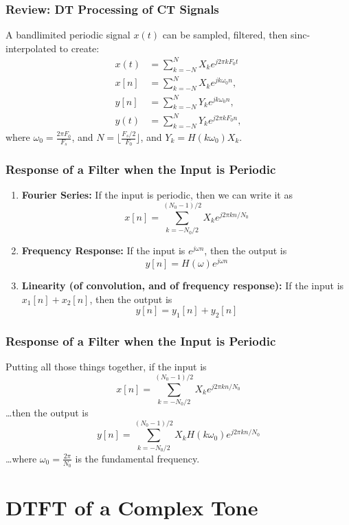 \documentclass{beamer}
\begin{document}
\begin{frame}
  \frametitle{Review: DT Processing of CT Signals}

  A bandlimited periodic signal $x(t)$ can be sampled, filtered, then
  sinc-interpolated to create:
  \begin{align*}
    x(t)&=\sum_{k=-N}^{N}X_ke^{j2\pi kF_0t}\\
    x[n]&=\sum_{k=-N}^{N}X_ke^{jk\omega_0n},\\
    y[n]&=\sum_{k=-N}^{N}Y_ke^{jk\omega_0n},\\
    y(t)&=\sum_{k=-N}^{N}Y_ke^{j2\pi kF_0n},
  \end{align*}
  where $\omega_0=\frac{2\pi F_0}{F_s}$, and
  $N=\lfloor\frac{F_s/2}{F_0}\rfloor$, and $Y_k=H(k\omega_0)X_k$.
\end{frame}


\begin{frame}
  \frametitle{Response of a Filter when the Input is Periodic}

  \begin{enumerate}
  \item {\bf Fourier Series:}
    If the input is periodic, then we can write  it as
    \[
    x[n] =\sum_{k=-N_0/2}^{(N_0-1)/2} X_k e^{j2\pi kn/N_0}
    \]
  \item {\bf Frequency Response:}
    If the input is $e^{j\omega n}$, then the output is
    \[
    y[n] = H(\omega)e^{j\omega n}
    \]
  \item {\bf Linearity (of convolution, and of frequency response):}
    If the input is $x_1[n]+x_2[n]$, then the output is
    \[
    y[n] = y_1[n]+y_2[n]
    \]
  \end{enumerate}
\end{frame}

\begin{frame}
  \frametitle{Response of a Filter when the Input is Periodic}

  Putting all those things together, if the input is
  \[
  x[n] =\sum_{k=-N_0/2}^{(N_0-1)/2} X_k e^{j2\pi kn/N_0}
  \]
  \ldots then the output is
  \[
  y[n] = \sum_{k=-N_0/2}^{(N_0-1)/2} X_k H(k\omega_0) e^{j2\pi kn/N_0}
  \]
  \ldots where $\omega_0=\frac{2\pi}{N_0}$ is the fundamental frequency.
\end{frame}


\section[Complex Tone]{DTFT of a Complex Tone}
\setcounter{subsection}{1}
\end{document}
